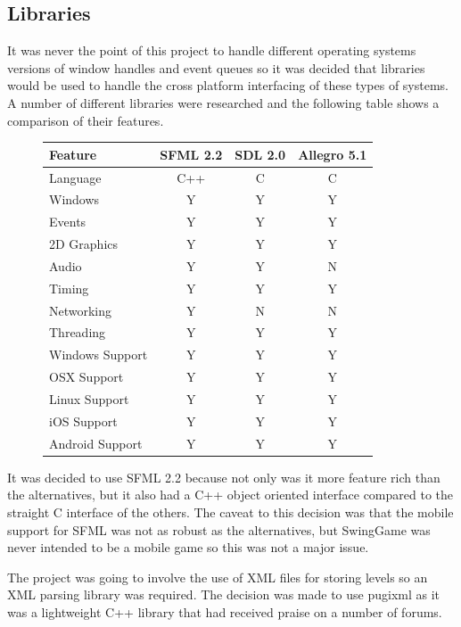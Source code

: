 \documentclass[]{report}
\begin{document}
		\subsection{Libraries}
		It was never the point of this project to handle different operating systems versions of window handles and event queues so it was decided that libraries would be used to handle the cross platform interfacing of these types of systems. A number of different libraries were researched and the following table shows a comparison of their features.
		
		\begin{figure}[H]
		\begin{tabular}[H]{ l || c | c | c }
			Feature & SFML 2.2 \cite{sfml} & SDL 2.0 \cite{sdl} & Allegro 5.1 \cite{allegro} \\
			\hline
			\hline
			Language & C++ & C & C \\
			Windows & Y & Y  & Y \\
			Events & Y & Y & Y \\
			2D Graphics & Y & Y & Y \\
			Audio & Y & Y & N \\
			Timing & Y & Y & Y \\
			Networking & Y & N & N \\
			Threading & Y & Y & Y \\
			\hline
			Windows Support & Y & Y & Y \\
			OSX Support & Y & Y & Y \\
			Linux Support & Y & Y & Y \\
			iOS Support & Y\footnotemark & Y & Y \\
			Android Support &Y\footnotemark[1] & Y & Y \\
		\end{tabular}
		\end{figure}
		
		
		It was decided to use SFML 2.2 \cite{sfml} because not only was it more feature rich than the alternatives, but it also had a C++ object oriented interface compared to the straight C interface of the others. The caveat to this decision was that the mobile support for SFML was not as robust as the alternatives, but SwingGame was never intended to be a mobile game so this was not a major issue.
		
		The project was going to involve the use of XML files for storing levels so an XML parsing library was required. The decision was made to use pugixml \cite{pugixml} as it was a lightweight C++ library that had received praise on a number of forums.
		
\end{document}
